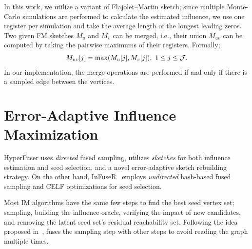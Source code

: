 In this work, we utilize a variant of Flajolet–Martin sketch; since multiple Monte-Carlo simulations are performed to calculate the estimated influence, we use one register per simulation and take the average length of the longest leading zeros. Two given FM sketches $M_u$ and $M_v$ can be merged, i.e., their union $M_{uv}$ can be computed by taking the pairwise maximums of their registers. Formally; 
\begin{equation}
\label{eq:sketch-merge}
    M_{uv}[j] = \max(M_u[j], M_v[j]),~1 \leq j \leq {\cal J}.
\end{equation} 
In our implementation, the merge operations are performed if and only if there is a sampled edge between the vertices. %


\section{Error-Adaptive Influence Maximization}\label{sec:method}

HyperFuser uses \emph{directed} fused sampling, utilizes \emph{sketches} for both influence estimation and seed selection, and a novel error-adaptive sketch rebuilding strategy. On the other hand, {\sc InFuseR}~\cite{infuser} employs {\emph {undirected}} hash-based fused sampling and CELF optimizations for seed selection.

Most IM algorithms have the same few steps to find the best seed vertex set; sampling, building the influence oracle, verifying the impact of new candidates, and removing the latent seed set's residual reachability set. Following the idea proposed in~\cite{infuser}, \acro fuses the sampling step with other steps to avoid reading the graph multiple times. 



